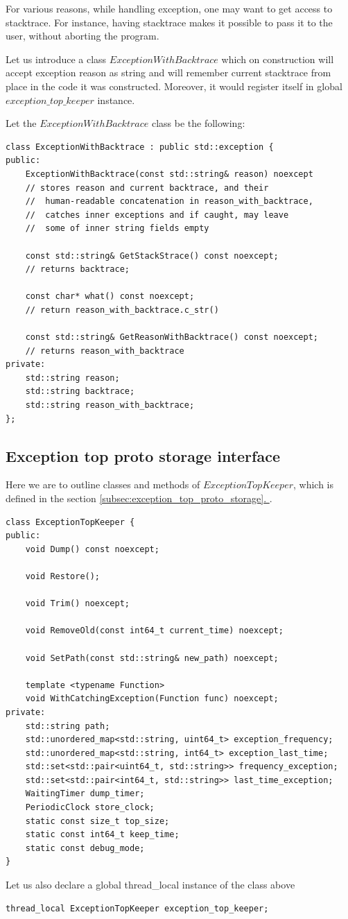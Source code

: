\documentclass{article}
\newcommand*{\fullref}[1]{\hyperref[{#1}]{\ref*{#1}. \nameref*{#1}}}
\begin{document}
For various reasons, while handling exception, one may want to get access to stacktrace. For instance, having stacktrace makes it possible to pass it to the user, without aborting the program.

Let us introduce a class $ExceptionWithBacktrace$ which on construction will accept exception reason as string and will remember current stacktrace from place in the code it was constructed. Moreover, it would register itself in global $exception\_top\_keeper$ instance.

Let the $ExceptionWithBacktrace$ class be the following:
\begin{lstlisting}
class ExceptionWithBacktrace : public std::exception {
public:
	ExceptionWithBacktrace(const std::string& reason) noexcept
	// stores reason and current backtrace, and their
	//	human-readable concatenation in reason_with_backtrace,
	//	catches inner exceptions and if caught, may leave
	//	some of inner string fields empty

	const std::string& GetStackStrace() const noexcept;
	// returns backtrace;

	const char* what() const noexcept;
	// return reason_with_backtrace.c_str()

	const std::string& GetReasonWithBacktrace() const noexcept;
	// returns reason_with_backtrace
private:
	std::string reason;
	std::string backtrace;
	std::string reason_with_backtrace;
};
\end{lstlisting}

\subsection{Exception top proto storage interface}

Here we are to outline classes and methods of $ExceptionTopKeeper$, which is defined in the section \fullref{subsec:exception_top_proto_storage}.

\begin{lstlisting}
class ExceptionTopKeeper {
public:
	void Dump() const noexcept;

	void Restore();

	void Trim() noexcept;

	void RemoveOld(const int64_t current_time) noexcept;

	void SetPath(const std::string& new_path) noexcept;

	template <typename Function>
	void WithCatchingException(Function func) noexcept;
private:
	std::string path;
	std::unordered_map<std::string, uint64_t> exception_frequency;
	std::unordered_map<std::string, int64_t> exception_last_time;
	std::set<std::pair<uint64_t, std::string>> frequency_exception;
	std::set<std::pair<int64_t, std::string>> last_time_exception;
	WaitingTimer dump_timer;
	PeriodicClock store_clock;
	static const size_t top_size;
	static const int64_t keep_time;
	static const debug_mode;
}
\end{lstlisting}

Let us also declare a global thread\_local instance of the class above

\begin{lstlisting}
thread_local ExceptionTopKeeper exception_top_keeper;
\end{lstlisting}
\end{document}
